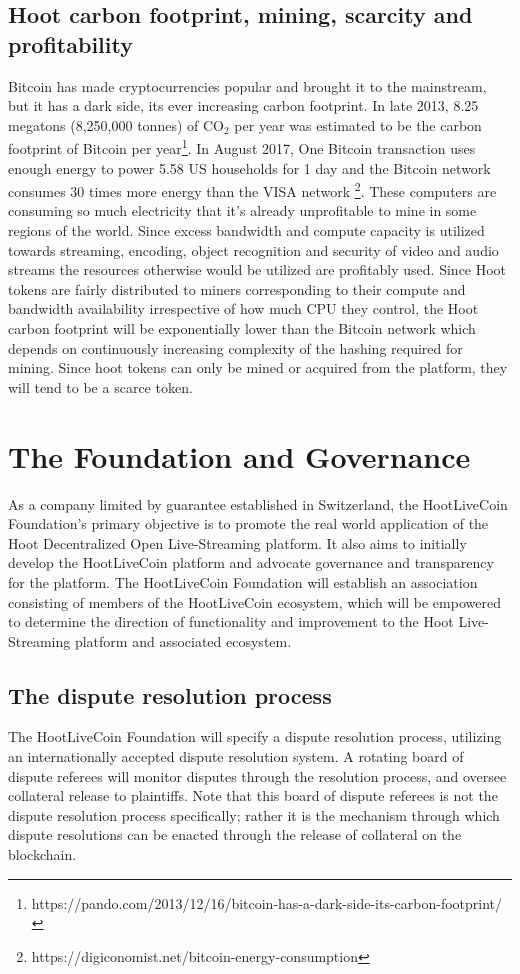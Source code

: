 \documentclass{article}
\begin{document}
\subsection{Hoot carbon footprint, mining, scarcity and profitability}
Bitcoin has made cryptocurrencies popular and brought it to the mainstream, but it has a dark side, its ever increasing carbon footprint. In late 2013, 8.25 megatons (8,250,000 tonnes) of CO$_2$ per year
was estimated to be the carbon footprint of Bitcoin per year\footnote{https://pando.com/2013/12/16/bitcoin-has-a-dark-side-its-carbon-footprint/}. In August 2017, One Bitcoin transaction uses enough energy to power 5.58 US households for 1 day and the Bitcoin network consumes 30 times more energy than the VISA network \footnote{https://digiconomist.net/bitcoin-energy-consumption}. These
computers are consuming so much electricity that it’s already unprofitable to mine in some regions of the world. Since excess bandwidth and compute capacity is utilized towards streaming, encoding, object recognition
and security of video and audio streams the resources otherwise would be utilized are profitably used. Since Hoot tokens are fairly distributed to miners corresponding to their compute and bandwidth availability irrespective of how much CPU they control, the Hoot carbon footprint will be exponentially lower than the Bitcoin network which depends on continuously increasing complexity of the hashing required for mining. Since hoot tokens can only be mined or acquired from the platform, they will tend to be a scarce token.

\section{The Foundation and Governance} %
\label{sec:the_foundation_and_governance}
As a company limited by guarantee established in Switzerland, the HootLiveCoin Foundation's primary objective is to promote the real world application of the Hoot Decentralized Open Live-Streaming platform. It also aims to initially develop the HootLiveCoin platform and advocate governance and transparency for the platform. The HootLiveCoin Foundation will establish an association consisting of members of the HootLiveCoin ecosystem, which will be empowered to determine the direction of functionality and improvement to the Hoot Live-Streaming platform and associated ecosystem.

\subsection{The dispute resolution process} %
\label{sub:the_dispute_resolution_process}
The HootLiveCoin Foundation will specify a dispute resolution process, utilizing an internationally accepted dispute resolution system. A rotating board of dispute referees will monitor disputes through the resolution process, and oversee collateral release to plaintiffs. Note that this board of dispute referees is not the dispute resolution process specifically; rather it is the mechanism through which dispute resolutions can be enacted through the release of collateral on the blockchain.
\end{document}
